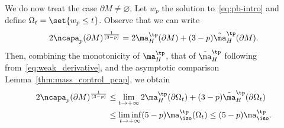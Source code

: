  We do now treat the case $\partial M \neq \varnothing$. Let $w_p$ the solution to~\eqref{eq:pb-intro} and define $\Omega_t = \set{w_p \leq t}$. Observe that we can write
 \[
 2\ncapa_p(\partial M)^{\frac{1}{(3-p)}} = 2 \ma_{H}^{\tp}(\partial M)+(3-p)\tilde{\ma}_{H}^{\tp}(\partial M).
 \]
 Then, combining the monotonicity of $\ma_{H}^{\tp}$, that of $\tilde{\ma}_{H}^{\tp}$ following from~\eqref{eq:weak_derivative}, and the asymptotic comparison Lemma~\ref{thm:mass_control_pcap}, we obtain
\begin{align}
 2\ncapa_p(\partial M)^{\frac{1}{(3-p)}} &{}\leq \lim_{t \to +\infty} 2 \ma_{H}^{\tp}(\partial \Omega_t)+(3-p)\tilde{\ma}_{H}^{\tp}(\partial \Omega_t)\nonumber\\
 &{} \leq \liminf_{t \to +\infty} (5-p) \ma_{\iso}^{\tp}(\Omega_t) \leq (5-p) \ma^{\tp}_{\iso}.\label{eq:monotonicitiescombined}
\end{align}
